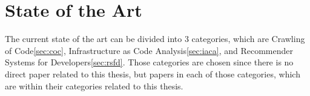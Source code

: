 \chapter{State of the Art}
\label{sec:stateofart}
The current state of the art can be divided into 3 categories, which are Crawling of Code\ref{sec:coc}, Infrastructure as Code Analysis\ref{sec:iaca}, and Recommender Systems for Developers\ref{sec:rsfd}. Those categories are chosen since there is no direct paper related to this thesis, but papers in each of those categories, which are within their categories related to this thesis.


